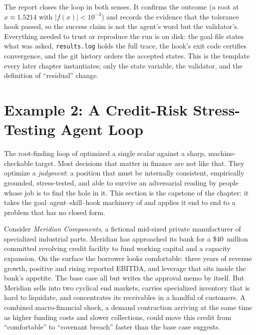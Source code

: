 The report closes the loop in both senses. It confirms the outcome (a root at
$x \approx 1.5214$ with $|f(x)| < 10^{-3}$) and records the evidence that the
tolerance hook passed, so the success claim is not the agent's word but the
validator's. Everything needed to trust or reproduce the run is on disk: the goal
file states what was asked, \texttt{results.log} holds the full trace, the hook's
exit code certifies convergence, and the git history orders the accepted states.
This is the template every later chapter instantiates; only the state variable,
the validator, and the definition of ``residual'' change.

\section{Example 2: A Credit-Risk Stress-Testing Agent Loop}\label{sec:example-credit-risk}

The root-finding loop of  optimized a single
scalar against a sharp, machine-checkable target. Most decisions that matter in
finance are not like that. They optimize a \emph{judgment}: a position that
must be internally consistent, empirically grounded, stress-tested, and able to
survive an adversarial reading by people whose job is to find the hole in it.
This section is the capstone of the chapter: it takes the goal--agent--skill--hook
machinery of  and applies it end to end to a problem
that has no closed form.

Consider \emph{Meridian Components}, a fictional mid-sized private manufacturer of
specialized industrial parts. Meridian has approached its bank for a \$40~million
committed revolving credit facility to fund working capital and a capacity
expansion. On the surface the borrower looks comfortable: three years of revenue
growth, positive and rising reported EBITDA, and leverage that sits inside the
bank's appetite. The base case all but writes the approval memo by itself. But
Meridian sells into two cyclical end markets, carries specialized inventory that is
hard to liquidate, and concentrates its receivables in a handful of customers. A
combined macro-financial shock, a demand contraction arriving at the same time
as higher funding costs and slower collections, could move this credit from
``comfortable'' to ``covenant breach'' faster than the base case suggests.

